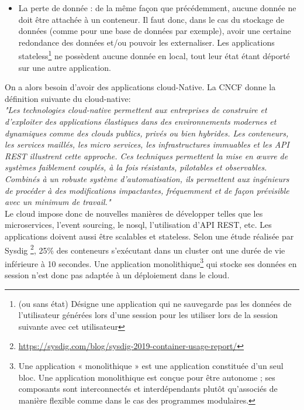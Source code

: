 \documentclass[11pt,fleqn]{book} %
\begin{document}
\begin{itemize}
    \item La perte de donnée : de la même façon que précédemment, aucune donnée ne doit être attachée à un conteneur. Il faut donc, dans le cas du stockage de données (comme pour une base de données par exemple), avoir une certaine redondance des données et/ou pouvoir les externaliser. Les applications stateless\footnote{(ou sans état) Désigne une application qui ne sauvegarde pas les données de l'utilisateur générées lors d'une session pour les utiliser lors de la session suivante avec cet utilisateur} ne possèdent aucune donnée en local, tout leur état étant déporté sur une autre application.\\
\end{itemize}

On a alors besoin d'avoir des applications cloud-Native. La CNCF donne la définition suivante du cloud-native: \\

\textit{"Les technologies cloud-native permettent aux entreprises de construire et d'exploiter des applications élastiques dans des environnements modernes et dynamiques comme des clouds publics, privés ou bien hybrides. Les conteneurs, les services maillés, les micro services, les infrastructures immuables et les API REST illustrent cette approche. Ces techniques permettent la mise en œuvre de systèmes faiblement couplés, à la fois résistants, pilotables et observables. Combinés à un robuste système d'automatisation, ils permettent aux ingénieurs de procéder à des modifications impactantes, fréquemment et de façon prévisible avec un minimum de travail."} \\

Le cloud impose donc de nouvelles manières de développer telles que les microservices, l'event sourcing, le nosql, l'utilisation d'API REST, etc. Les applications doivent aussi être scalables et stateless. Selon une étude réalisée par Sysdig \footnote{\url{https://sysdig.com/blog/sysdig-2019-container-usage-report/}}, 25\% des conteneurs s'exécutant dans un cluster ont une durée de vie inférieure à 10 secondes. Une application monolithique\footnote{Une application « monolithique » est une application constituée d'un seul bloc. Une application monolithique est conçue pour être autonome ; ses composants sont interconnectés et interdépendants plutôt qu'associés de manière flexible comme dans le cas des programmes modulaires.} qui stocke ses données en session n'est donc pas adaptée à un déploiement dans le cloud.\\
\end{document}
